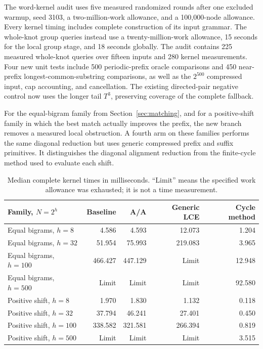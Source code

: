 \documentclass[11pt]{article}
\theoremstyle{definition}
\theoremstyle{remark}
\begin{document}
The word-kernel audit uses five measured randomized rounds after one excluded
warmup, seed 3103, a two-million-work allowance, and a 100,000-node allowance.
Every kernel timing includes complete construction of its input grammar.
The whole-knot group queries instead use a twenty-million-work allowance,
15 seconds for the local group stage, and 18 seconds globally.
The audit contains 225 measured whole-knot queries over fifteen inputs and
280 kernel measurements. Four new unit tests include 500 periodic-prefix
oracle comparisons and 450 near-prefix longest-common-substring
comparisons, as well as the $2^{500}$ compressed input, cap accounting,
and cancellation. The existing directed-pair negative control now uses
the longer tail $T^3$, preserving coverage of the complete fallback.

For the equal-bigram family from Section~\ref{sec:matching}, and for a
positive-shift family in which the best match actually improves the prefix,
the new branch removes a measured local obstruction. A fourth arm on these
families performs the same diagonal reduction but uses generic compressed
prefix and suffix primitives. It distinguishes the diagonal alignment
reduction from the finite-cycle method used to evaluate each shift.

\begin{table}[ht]
\centering\small
\begin{tabularx}{\linewidth}{Yrrrr}
\toprule
Family, $N=2^h$ & Baseline & A/A & Generic LCE & Cycle method\\
\midrule
Equal bigrams, $h=8$ & 4.586 & 4.593 & 12.073 & 1.204\\
Equal bigrams, $h=32$ & 51.954 & 75.993 & 219.083 & 3.965\\
Equal bigrams, $h=100$ & 466.427 & 447.129 & Limit & 12.948\\
Equal bigrams, $h=500$ & Limit & Limit & Limit & 92.580\\
Positive shift, $h=8$ & 1.970 & 1.830 & 1.132 & 0.118\\
Positive shift, $h=32$ & 37.794 & 46.241 & 27.401 & 0.450\\
Positive shift, $h=100$ & 338.582 & 321.581 & 266.394 & 0.819\\
Positive shift, $h=500$ & Limit & Limit & Limit & 3.515\\
\bottomrule
\end{tabularx}
\caption{Median complete kernel times in milliseconds. ``Limit'' means
the specified work allowance was exhausted; it is not a time measurement.}
\label{tab:lcs-timings}
\end{table}
\end{document}
